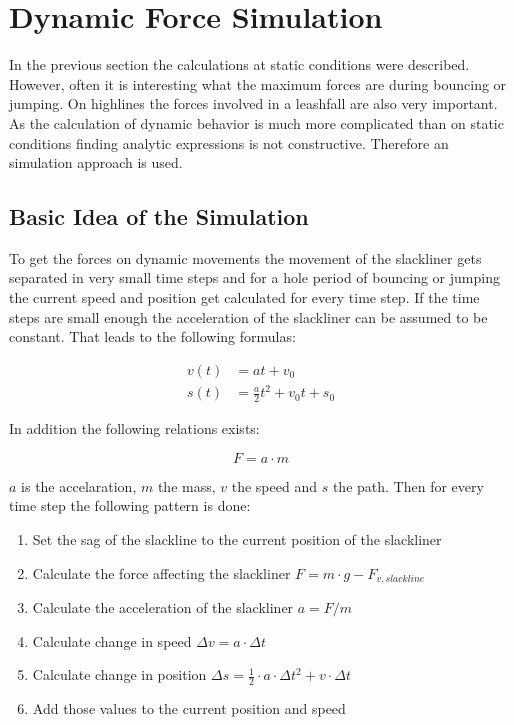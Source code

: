 \chapter{Dynamic Force Simulation}

In the previous section the calculations at static conditions were described. However, often it is interesting what the maximum forces are during bouncing or jumping. On highlines the forces involved in a leashfall are also very important. As the calculation of dynamic behavior is much more complicated than on static conditions finding analytic expressions is not constructive. Therefore an simulation approach is used.


\section{Basic Idea of the Simulation}
To get the forces on dynamic movements the movement of the slackliner gets separated in very small time steps and for a hole period of bouncing or jumping the current speed and position get calculated for every time step. If the time steps are small enough the acceleration of the slackliner can be assumed to be constant. That leads to the following formulas:

\begin{align}
	v(t) &= at+v_0 \\
	s(t) &= \frac{a}{2}t^2 + v_0 t + s_0
\end{align}

In addition the following relations exists:

\begin{equation}
	F = a\cdot m
\end{equation}

$a$ is the accelaration, $m$ the mass, $v$ the speed and $s$ the path. Then for every time step the following pattern is done:

\begin{enumerate}
	\item Set the sag of the slackline to the current position of  the slackliner
	\item Calculate the force affecting the slackliner $F = m\cdot g - F_{v,slackline}$
	\item Calculate the acceleration of the slackliner $a = F / m$
	\item Calculate change in speed $\Delta v = a\cdot\Delta t$
	\item Calculate change in position $\Delta s = \frac{1}{2}\cdot a\cdot\Delta t^2 + v\cdot\Delta t$
	\item Add those values to the current position and speed
\end{enumerate}

